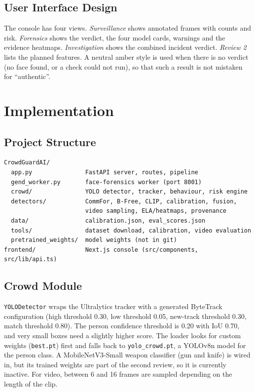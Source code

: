 \documentclass[12pt,a4paper,oneside]{report}
\begin{document}
\section{User Interface Design}
The console has four views. \emph{Surveillance} shows annotated frames with counts and risk. \emph{Forensics} shows the verdict, the four model cards, warnings and the evidence heatmaps. \emph{Investigation} shows the combined incident verdict. \emph{Review 2} lists the planned features. A neutral amber style is used when there is no verdict (no face found, or a check could not run), so that such a result is not mistaken for ``authentic''.

\chapter{Implementation}

\section{Project Structure}
\begin{verbatim}
CrowdGuardAI/
  app.py               FastAPI server, routes, pipeline
  gend_worker.py       face-forensics worker (port 8001)
  crowd/               YOLO detector, tracker, behaviour, risk engine
  detectors/           CommFor, B-Free, CLIP, calibration, fusion,
                       video sampling, ELA/heatmaps, provenance
  data/                calibration.json, eval_scores.json
  tools/               dataset download, calibration, video evaluation
  pretrained_weights/  model weights (not in git)
frontend/              Next.js console (src/components, src/lib/api.ts)
\end{verbatim}

\section{Crowd Module}
\texttt{YOLODetector} wraps the Ultralytics tracker with a generated ByteTrack configuration (high threshold 0.30, low threshold 0.05, new-track threshold 0.30, match threshold 0.80). The person confidence threshold is 0.20 with IoU 0.70, and very small boxes need a slightly higher score. The loader looks for custom weights (\texttt{best.pt}) first and falls back to \texttt{yolo\_crowd.pt}, a YOLOv8n model for the person class. A MobileNetV3-Small weapon classifier (gun and knife) is wired in, but its trained weights are part of the second review, so it is currently inactive. For video, between 6 and 16 frames are sampled depending on the length of the clip.
\end{document}
